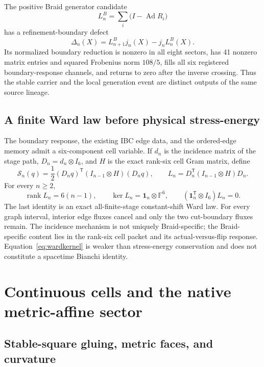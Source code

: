 \documentclass[11pt]{article}
\theoremstyle{definition}
\theoremstyle{remark}
\newcommand{\Ad}{\operatorname{Ad}}
\newcommand{\rank}{\operatorname{rank}}
\begin{document}
The positive Braid generator candidate
\begin{equation}\label{eq:braidgenerator}
 L_n^B=\sum_i\bigl(I-\Ad R_i\bigr)
\end{equation}
has a refinement-boundary defect
\begin{equation}\label{eq:boundarydefect}
 \Delta_n(X)=L_{n+1}^Bj_n(X)-j_nL_n^B(X).
\end{equation}
Its normalized boundary reduction is nonzero in all eight sectors, has 41 nonzero matrix entries and squared Frobenius norm $108/5$, fills all six registered boundary-response channels, and returns to zero after the inverse crossing. Thus the stable carrier and the local generation event are distinct outputs of the same source lineage.

\subsection{A finite Ward law before physical stress-energy}

The boundary response, the existing IBC edge data, and the ordered-edge memory admit a six-component cell variable. If $d_n$ is the incidence matrix of the stage path, $D_n=d_n\otimes I_6$, and $H$ is the exact rank-six cell Gram matrix, define
\begin{equation}\label{eq:wardaction}
 \mathcal S_n(q)=\frac12(D_nq)^{\mathsf T}(I_{n-1}\otimes H)(D_nq),
 \qquad
 L_n=D_n^{\mathsf T}(I_{n-1}\otimes H)D_n.
\end{equation}
For every $n\ge2$,
\begin{equation}\label{eq:wardkernel}
 \rank L_n=6(n-1),\qquad
 \ker L_n=\mathbf1_n\otimes\mathbb F^6,
 \qquad
 (\mathbf1_n^{\mathsf T}\otimes I_6)L_n=0.
\end{equation}
The last identity is an exact all-finite-stage constant-shift Ward law. For every graph interval, interior edge fluxes cancel and only the two cut-boundary fluxes remain. The incidence mechanism is not uniquely Braid-specific; the Braid-specific content lies in the rank-six cell packet and its actual-versus-flip response. Equation~\eqref{eq:wardkernel} is weaker than stress-energy conservation and does not constitute a spacetime Bianchi identity.

\section{Continuous cells and the native metric-affine sector}

\subsection{Stable-square gluing, metric faces, and curvature}
\end{document}
